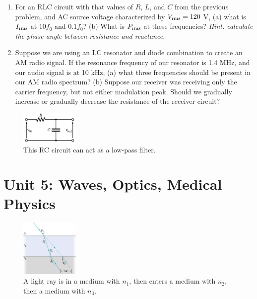 \documentclass[12pt,twocolumn]{article}
\begin{document}
\begin{enumerate}
\item For an RLC circuit with that values of $R$, $L$, and $C$ from the previous problem, and AC source voltage characterized by $V_{\rm rms} = 120$ V, (a) what is $I_{\rm rms}$ at $10 f_0$ and $0.1 f_0$? (b) What is $P_{\rm rms}$ at these frequencies? \textit{Hint: calculate the phase angle between resistance and reactance.} \\ \vspace{4cm}
\item Suppose we are using an LC resonator and diode combination to create an AM radio signal.  If the resonance frequency of our resonator is 1.4 MHz, and our audio signal is at 10 kHz, (a) what three frequencies should be present in our AM radio spectrum?  (b) Suppose our receiver was receiving only the carrier frequency, but not either modulation peak.  Should we gradually increase or gradually decrease the resistance of the receiver circuit?  \\ \vspace{2cm}
\end{enumerate}

\begin{figure}[hb]
\centering
\includegraphics[width=0.25\textwidth]{low-pass.png}
\caption{\label{fig:RC} \small This RC circuit can act as a low-pass filter.}
\end{figure}

\clearpage

\section{Unit 5: Waves, Optics, Medical Physics}

\begin{figure}[ht]
\centering
\includegraphics[width=0.25\textwidth]{lens_1.jpeg}
\caption{\label{fig:lens_1} \small A light ray is in a medium with $n_1$, then enters a medium with $n_2$, then a medium with $n_3$.}
\end{figure}
\end{document}
